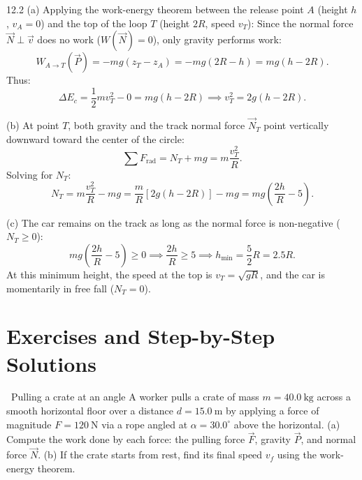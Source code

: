 \begin{solution}{12.2}
(a) Applying the work-energy theorem between the release point $A$ (height $h$, $v_A = 0$) and the top of the loop $T$ (height $2R$, speed $v_T$):
Since the normal force $\vec{N}\perp\vec{v}$ does no work ($W(\vec{N}) = 0$), only gravity performs work:
\[
W_{A\to T}(\vec{P}) = -mg(z_T - z_A) = -mg(2R - h) = mg(h - 2R).
\]
Thus:
\[
\Delta E_c = \frac{1}{2}m v_T^2 - 0 = mg(h - 2R) \implies \boxed{v_T^2 = 2g(h - 2R).}
\]

(b) At point $T$, both gravity and the track normal force $\vec{N}_T$ point vertically downward toward the center of the circle:
\[
\sum F_{\text{rad}} = N_T + mg = m\frac{v_T^2}{R}.
\]
Solving for $N_T$:
\[
N_T = m\frac{v_T^2}{R} - mg = \frac{m}{R}\left[ 2g(h - 2R) \right] - mg = mg\left( \frac{2h}{R} - 5 \right).
\]

(c) The car remains on the track as long as the normal force is non-negative ($N_T \ge 0$):
\[
mg\left( \frac{2h}{R} - 5 \right) \ge 0 \implies \frac{2h}{R} \ge 5 \implies \boxed{h_{\min} = \frac{5}{2}R = 2.5R.}
\]
At this minimum height, the speed at the top is $v_T = \sqrt{gR}$, and the car is momentarily in free fall ($N_T = 0$).
\end{solution}

\section{Exercises and Step-by-Step Solutions}

\begin{exercise}{\warm\ Pulling a crate at an angle}
A worker pulls a crate of mass $m=40.0\ \mathrm{kg}$ across a smooth horizontal floor over a distance $d=15.0\ \mathrm{m}$ by applying a force of magnitude $F=120\ \mathrm{N}$ via a rope angled at $\alpha=30.0^\circ$ above the horizontal.
(a) Compute the work done by each force: the pulling force $\vec{F}$, gravity $\vec{P}$, and normal force $\vec{N}$.
(b) If the crate starts from rest, find its final speed $v_f$ using the work-energy theorem.
\end{exercise}

\begin{tabletworkspace}[5.0cm]
\end{tabletworkspace}

